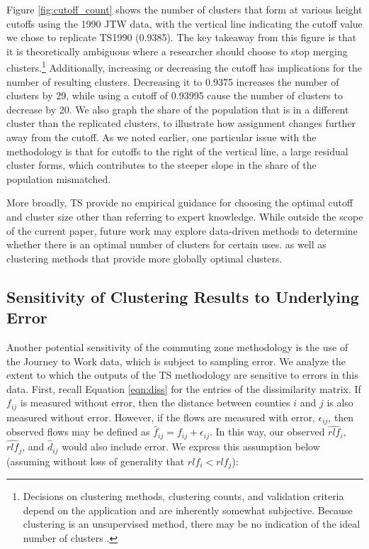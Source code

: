 Figure \ref{fig:cutoff_count} shows the number of clusters that form at various height cutoffs using the 1990 JTW data, with the vertical line indicating the cutoff value we chose to replicate TS1990 (0.9385). The key takeaway from this figure is that it is theoretically ambiguous where a researcher should choose to stop merging clusters.\footnote{Decisions on clustering methods, clustering counts, and validation criteria depend on the application and are inherently somewhat subjective. Because clustering is an unsupervised method, there may be no indication of the ideal number of clusters \citep{HBV2001}.} Additionally, increasing or decreasing the cutoff has implications for the number of resulting clusters. Decreasing it to 0.9375 increases the number of clusters by 29, while using a cutoff of 0.93995 cause the number of clusters to decrease by 20. We also graph the share of the population that is in a different cluster than the replicated clusters, to illustrate how assignment changes further away from the cutoff. As we noted earlier, one particular issue with the methodology is that for cutoffs to the right of the vertical line, a large residual cluster forms, which contributes to the steeper slope in the share of the population mismatched.


More broadly, TS provide no empirical guidance for choosing the optimal cutoff and cluster size other than referring to expert knowledge. While outside the scope of the current paper, future work may explore data-driven methods to determine whether there is an optimal number of clusters for certain uses. as well as clustering methods that provide more globally optimal clusters.

\subsection{Sensitivity of Clustering Results to Underlying Error}
\FloatBarrier

Another potential sensitivity of the commuting zone methodology is the use of the Journey to Work data, which is subject to sampling error. We analyze the extent to which the outputs of the TS methodology are sensitive to errors in this data. First, recall Equation \ref{eqn:diss} for the entries of the dissimilarity matrix. If $f_{ij}$ is measured without error, then the distance between counties $i$ and $j$ is also measured without error. However, if the flows are measured with error, $\epsilon_{ij}$, then observed flows may be defined as $\hat{f}_{ij}=f_{ij}+\epsilon_{ij}$. In this way, our observed $\hat{rlf}_{i}$, $\hat{rlf}_{j}$, and $\hat{d}_{ij}$ would also include error. We express this assumption below (assuming without loss of generality that $rlf_i < rlf_j$):

